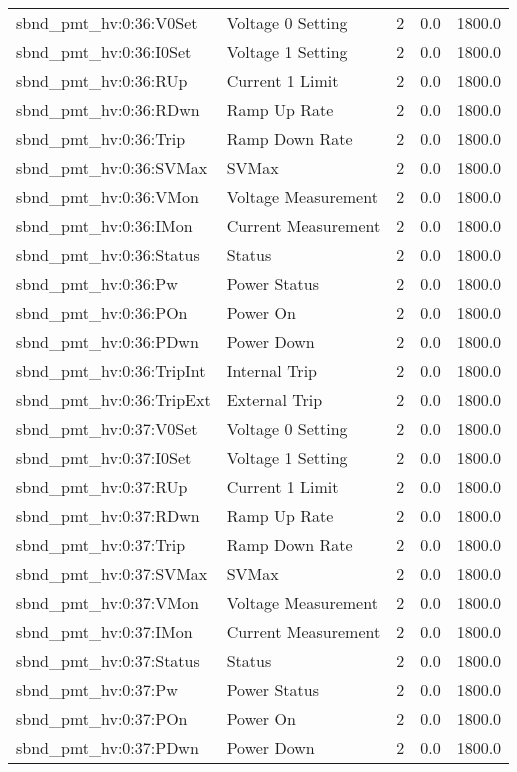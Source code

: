 \begin{center}
\begin{longtable}{l | l l l l }
sbnd\_pmt\_hv:0:36:V0Set & Voltage 0 Setting & 2 & 0.0 & 1800.0\\ 
sbnd\_pmt\_hv:0:36:I0Set & Voltage 1 Setting & 2 & 0.0 & 1800.0\\ 
sbnd\_pmt\_hv:0:36:RUp & Current 1 Limit & 2 & 0.0 & 1800.0\\ 
sbnd\_pmt\_hv:0:36:RDwn & Ramp Up Rate & 2 & 0.0 & 1800.0\\ 
sbnd\_pmt\_hv:0:36:Trip & Ramp Down Rate & 2 & 0.0 & 1800.0\\ 
sbnd\_pmt\_hv:0:36:SVMax & SVMax & 2 & 0.0 & 1800.0\\ 
sbnd\_pmt\_hv:0:36:VMon & Voltage Measurement & 2 & 0.0 & 1800.0\\ 
sbnd\_pmt\_hv:0:36:IMon & Current Measurement & 2 & 0.0 & 1800.0\\ 
sbnd\_pmt\_hv:0:36:Status & Status & 2 & 0.0 & 1800.0\\ 
sbnd\_pmt\_hv:0:36:Pw & Power Status & 2 & 0.0 & 1800.0\\ 
sbnd\_pmt\_hv:0:36:POn & Power On & 2 & 0.0 & 1800.0\\ 
sbnd\_pmt\_hv:0:36:PDwn & Power Down & 2 & 0.0 & 1800.0\\ 
sbnd\_pmt\_hv:0:36:TripInt & Internal Trip & 2 & 0.0 & 1800.0\\ 
sbnd\_pmt\_hv:0:36:TripExt & External Trip & 2 & 0.0 & 1800.0\\ 
sbnd\_pmt\_hv:0:37:V0Set & Voltage 0 Setting & 2 & 0.0 & 1800.0\\ 
sbnd\_pmt\_hv:0:37:I0Set & Voltage 1 Setting & 2 & 0.0 & 1800.0\\ 
sbnd\_pmt\_hv:0:37:RUp & Current 1 Limit & 2 & 0.0 & 1800.0\\ 
sbnd\_pmt\_hv:0:37:RDwn & Ramp Up Rate & 2 & 0.0 & 1800.0\\ 
sbnd\_pmt\_hv:0:37:Trip & Ramp Down Rate & 2 & 0.0 & 1800.0\\ 
sbnd\_pmt\_hv:0:37:SVMax & SVMax & 2 & 0.0 & 1800.0\\ 
sbnd\_pmt\_hv:0:37:VMon & Voltage Measurement & 2 & 0.0 & 1800.0\\ 
sbnd\_pmt\_hv:0:37:IMon & Current Measurement & 2 & 0.0 & 1800.0\\ 
sbnd\_pmt\_hv:0:37:Status & Status & 2 & 0.0 & 1800.0\\ 
sbnd\_pmt\_hv:0:37:Pw & Power Status & 2 & 0.0 & 1800.0\\ 
sbnd\_pmt\_hv:0:37:POn & Power On & 2 & 0.0 & 1800.0\\ 
sbnd\_pmt\_hv:0:37:PDwn & Power Down & 2 & 0.0 & 1800.0\\ 

\end{longtable}
\end{center}
